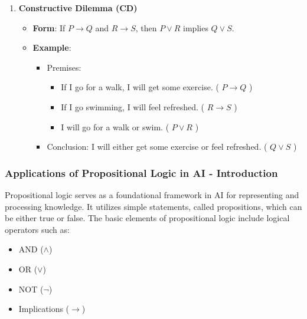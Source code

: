 \documentclass[aspectratio=169]{beamer}
\begin{document}
\begin{frame}[fragile]
\begin{enumerate}
    \item \textbf{Constructive Dilemma (CD)}  
      \begin{itemize}
        \item \textbf{Form}: If \( P \rightarrow Q \) and \( R \rightarrow S \), then \( P \lor R \) implies \( Q \lor S \).
        \item \textbf{Example}:
        \begin{itemize}
          \item Premises:  
            \begin{itemize}
              \item If I go for a walk, I will get some exercise. ( \( P \rightarrow Q \) )  
              \item If I go swimming, I will feel refreshed. ( \( R \rightarrow S \) )  
              \item I will go for a walk or swim. ( \( P \lor R \) )
            \end{itemize}
          \item Conclusion: I will either get some exercise or feel refreshed. ( \( Q \lor S \) )
        \end{itemize}
      \end{itemize}
  \end{enumerate}
\end{frame}

\begin{frame}[fragile]
    \frametitle{Applications of Propositional Logic in AI - Introduction}
    Propositional logic serves as a foundational framework in AI for representing and processing knowledge. It utilizes simple statements, called propositions, which can be either true or false. The basic elements of propositional logic include logical operators such as:

    \begin{itemize}
        \item AND ($\land$)
        \item OR ($\lor$)
        \item NOT ($\lnot$)
        \item Implications ($\rightarrow$)
    \end{itemize}
\end{frame}
\end{document}
